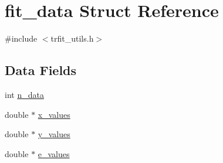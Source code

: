 \hypertarget{structfit__data}{
\section{fit\_\-data Struct Reference}
\label{structfit__data}
}


{\ttfamily \#include $<$trfit\_\-utils.h$>$}\subsection*{Data Fields}
\begin{DoxyCompactItemize}
\item 
int \hyperlink{structfit__data_ae9f10db86844961dcd181100969c9165}{n\_\-data}
\item 
double $\ast$ \hyperlink{structfit__data_a1c6e3ff09d22028544d999e46bb7c625}{x\_\-values}
\item 
double $\ast$ \hyperlink{structfit__data_a7eb6386abb30ccac9cf332fada926fe3}{y\_\-values}
\item 
double $\ast$ \hyperlink{structfit__data_aba48a3681410b47505650b02fbf12fc2}{e\_\-values}
\end{DoxyCompactItemize}


